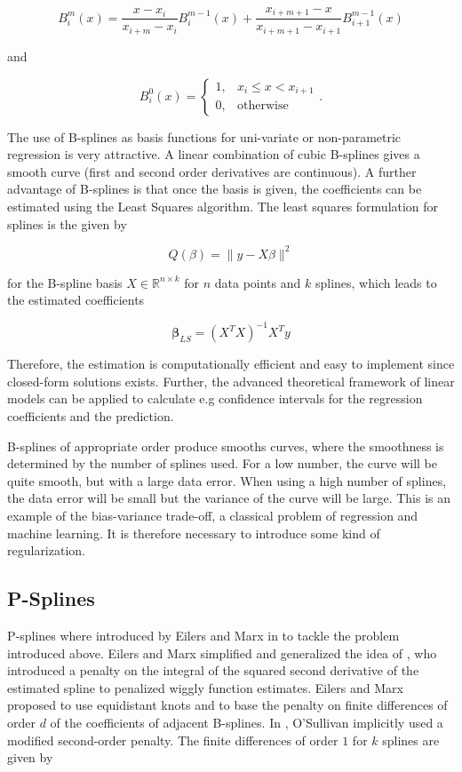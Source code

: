 \documentclass[10pt,a4paper]{article}
\begin{document}
$$B_i^m(x) = \frac{x - x_i}{x_{i+m} - x_i} B_i^{m-1}(x) + \frac{x_{i+m+1} - x}{x_{i+m+1} - x_{i+1}} B_{i+1}^{m-1}(x)$$

and

$$B_i^0(x) = \begin{cases} 1, & x_i \le x < x_{i+1} \\ 0, & \text{otherwise} \end{cases}.$$

The use of B-splines as basis functions for uni-variate or non-parametric regression is very attractive. A linear combination of cubic B-splines gives a smooth curve (first and second order derivatives are continuous). A further advantage of B-splines is that once the basis is given, the coefficients can be estimated using the Least Squares algorithm. The least squares formulation for splines is the given by

$$Q(\beta) = \lVert y - X\beta\rVert^2$$

for the B-spline basis $X \in \mathbb{R}^{n \times k}$ for $n$ data points and $k$ splines, which leads to the estimated coefficients 

$$\boldsymbol{\beta}_{LS} = (X^TX)^{-1}X^T y$$

Therefore, the estimation is computationally efficient and easy to implement since closed-form solutions exists. Further, the advanced theoretical framework of linear models can be applied to calculate e.g confidence intervals for the regression coefficients and the prediction.

B-splines of appropriate order  produce smooths curves, where the smoothness is determined by the number of splines used. For a low number, the curve will be quite smooth, but with a large data error. When using a high number of splines, the data error will be small but the variance of the curve will be large. This is an example of the bias-variance trade-off, a classical problem of regression and machine learning. It is therefore necessary to introduce some kind of regularization. \cite{deBoor1978practicalGuideToSplines}  

\subsection{P-Splines} \label{SubsectionPspline}

P-splines where introduced by Eilers and Marx in \cite{eilers1996flexible} to tackle the problem introduced above. Eilers and Marx simplified and generalized the idea of \cite{osullivan1986statistical}, who introduced a penalty on the integral of the squared second derivative of the estimated spline to penalized wiggly function estimates. Eilers and Marx proposed to use equidistant knots and to base the penalty on finite differences of order $d$ of the coefficients of adjacent B-splines. In \cite{osullivan1986statistical}, O'Sullivan implicitly used a modified second-order penalty. The finite differences of order $1$ for $k$ splines are given by
\end{document}
